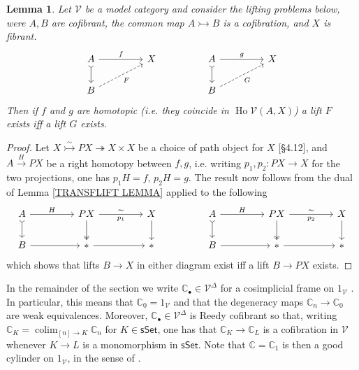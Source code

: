 \documentclass[a4paper,10pt
,draft
]{article}%
\numberwithin{equation}{section}
\numberwithin{figure}{section}
\newtheorem{lemma}[equation]{Lemma}%
\theoremstyle{definition} %
\DeclareMathOperator{\colim}{colim}%
\DeclareMathOperator{\Ho}{Ho}
\newcommand{\V}{\ensuremath{\mathcal V}}
\newcommand{\1}{\ensuremath{\mathbbm 1}}%
\begin{document}
\begin{lemma}\label{LIFTEQUIV LEM}
Let $\V$ be a model category and
consider the lifting problems below, were $A,B$ are cofibrant, 
the common map $A \rightarrowtail B$ is a cofibration, and $X$ is fibrant.
\begin{equation}
\begin{tikzcd}[column sep = 45pt]
	A
	\ar[rightarrowtail]{d}
	\arrow{r}{f}
&
	X
&%
	A
	\ar[rightarrowtail]{d}
	\arrow{r}{g}
&
	X
\\
	B \ar[dashed]{ru}[swap]{F}
&
&%
	B \ar[dashed]{ru}[swap]{G}
&
\end{tikzcd}
\end{equation}
Then if $f$ and $g$ are homotopic 
(i.e. they coincide in $\Ho \V(A,X)$)
a lift $F$ exists iff a lift $G$ exists.
\end{lemma}

\begin{proof}
Let 
$X \overset{\sim}{\rightarrowtail} PX 
\twoheadrightarrow X \times X$
be a choice of path object for $X$ \cite{DS95}[\S 4.12],
and $A \xrightarrow{H} PX$
be a right homotopy between $f,g$,
i.e. writing $p_1,p_2 \colon PX \to X$ for the two projections,
one has
$p_1H=f$, $p_2H=g$.
The result now follows from the dual of Lemma \ref{TRANSFLIFT LEMMA}
applied to the following
\begin{equation}
\begin{tikzcd}[column sep = 45pt]
	A
	\ar[rightarrowtail]{d}
	\arrow{r}{H}
&
	PX
	\arrow[twoheadrightarrow]{d} \ar{r}{\sim}[swap]{p_1}
&
	X \ar{d}
&%
	A
	\ar[rightarrowtail]{d}
	\arrow{r}{H}
&
	PX
	\arrow[twoheadrightarrow]{d} \ar{r}{\sim}[swap]{p_2}
&
	X \ar{d}
\\
	B
	\arrow{r}
&
	\**\ar{r}
&
	\**
&%
	B
	\arrow{r}
&
	\**\ar{r}
&
	\**
\end{tikzcd}
\end{equation}
which shows that lifts $B \to X$ in either diagram
exist iff a lift $B \to PX$ exists.
\end{proof}



In the remainder of the section we write
$\mathbb{C}_{\bullet} \in \V^{\Delta}$
for a cosimplicial frame on $1_{\V}$
\cite[Def. 16.6.1]{Hir03}.
In particular, this means that 
$\mathbb{C}_0 = 1_{\V}$
and that the degeneracy maps
$\mathbb{C}_n \to \mathbb{C}_0$ 
are weak equivalences.
Moreover, $\mathbb{C}_{\bullet} \in \V^{\Delta}$ is Reedy cofibrant so that, writing
$\mathbb{C}_{K} = \colim_{[n] \to K} \mathbb{C}_n$
for $K \in \mathsf{sSet}$,
one has that 
$\mathbb{C}_{K} \to \mathbb{C}_{L}$
is a cofibration in $\V$
whenever $K\to L$ is a monomorphism in $\mathsf{sSet}$.
Note that $\mathbb{C} = \mathbb{C}_1$
is then a good cylinder on $1_{\V}$, in the sense of \cite[Def. 4.2(i)]{DS95}.
\end{document}
